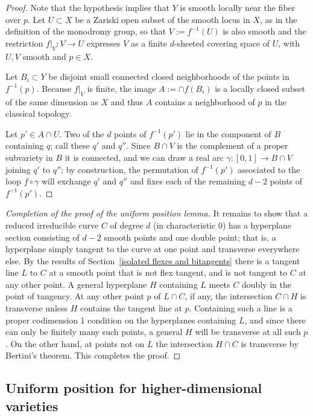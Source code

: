 \begin{proof} Note that the hypothesis implies that $Y$ is smooth
locally near the fiber over $p$. Let $U \subset X$ be a Zariski open subset of the smooth locus in $X$, as in the definition of the monodromy group, so that  $V := f^{-1}(U)$ is also smooth and the restriction $f|_V : V \to U$ expresses $V$ as a finite $d$-sheeted covering space of $U$, with $U,V$ smooth and $p\in X$.

Let $B_i\subset Y$ be disjoint small connected closed neighborhoods of the points
in $f^{-1}(p)$. Because $f|_V$  is finite, the image $A := \cap f(B_i)$  is a locally
closed subset of the same dimension as $X$ and thus $A$
 contains a neighborhood
of $p$ in the classical topology.

Let $p' \in A \cap U$. Two of the $d$ points of $f^{-1}(p')$  lie in the component  of $B$ containing $q$; call these $q'$ and $q''$. Since $B \cap V$ is the complement of a proper subvariety in $B$ it is connected, and we can draw a real arc $\gamma : [0,1] \to B \cap V$ joining $q'$ to $q''$; by construction, the permutation of $f^{-1}(p')$ associated to the loop $f \circ \gamma$ will exchange $q'$ and $q''$ and fixes each of the remaining $d-2$ points of $f^{-1}(p')$.
\end{proof}

\begin{proof}[Completion of the proof of the uniform position lemma]
 It remains to show that a reduced irreducible curve $C$ of degree $d$ (in characteristic 0)
 has a hyperplane section consisting of $d-2$ smooth points and one double point; that is, a hyperplane simply tangent to the curve at one point and transverse everywhere else. By the results of 
 Section~\ref{isolated flexes and bitangents} there is a tangent line $L$ to $C$ at a smooth point that is not flex tangent, and is not tangent to $C$ at any other point. A general hyperplane $H$ containing $L$ meets $C$ doubly in the point of
 tangency. At any other point $p$ of $L\cap C$, if any, the intersection $C\cap H$ is transverse
 unless $H$ contains the tangent line at $p$. Containing such a line is a  proper codimension 1 condition on
 the hyperplanes containing $L$, and since there can only be finitely many such points, a
 general  $H$ will be transverse at all such $p$. On the other hand, at points not on $L$
 the intersection $H\cap C$ is transverse by Bertini's theorem. This completes the proof.
\end{proof}

\subsection{Uniform position for higher-dimensional varieties}

